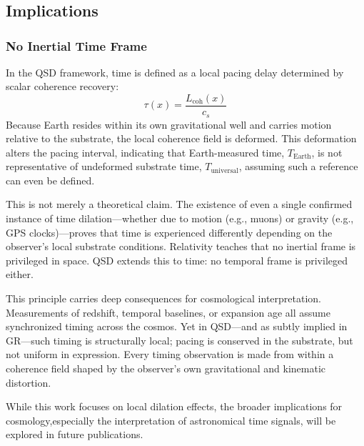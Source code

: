 \documentclass[entropy,article,submit,pdftex,moreauthors]{Definitions/mdpi}
\begin{document}
\section[\appendixname~\thesection]{}
\subsection[\appendixname~\thesubsection]{Implications}

\subsubsection{No Inertial Time Frame}

In the QSD framework, time is defined as a local pacing delay determined by scalar coherence recovery:
\[
\tau(x) = \frac{L_{\text{coh}}(x)}{c_s}
\]
Because Earth resides within its own gravitational well and carries motion relative to the substrate, the local coherence field is deformed. This deformation alters the pacing interval, indicating that Earth-measured time, \( T_{\text{Earth}} \), is not representative of undeformed substrate time, \( T_{\text{universal}} \), assuming such a reference can even be defined.

This is not merely a theoretical claim. The existence of even a single confirmed instance of time dilation—whether due to motion (e.g., muons) or gravity (e.g., GPS clocks)—proves that time is experienced differently depending on the observer’s local substrate conditions. Relativity teaches that no inertial frame is privileged in space. QSD extends this to time: no temporal frame is privileged either.

This principle carries deep consequences for cosmological interpretation. Measurements of redshift, temporal baselines, or expansion age all assume synchronized timing across the cosmos. Yet in QSD—and as subtly implied in GR—such timing is structurally local; pacing is conserved in the substrate, but not uniform in expression. Every timing observation is made from within a coherence field shaped by the observer’s own gravitational and kinematic distortion.

While this work focuses on local dilation effects, the broader implications for cosmology,especially the interpretation of astronomical time signals, will be explored in future publications.
\end{document}
